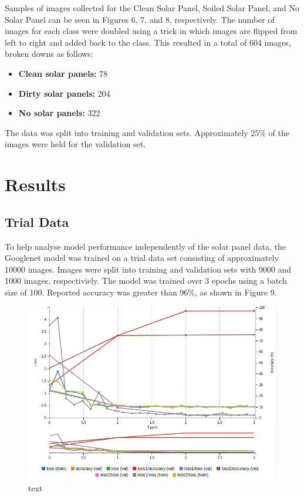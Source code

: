 \documentclass[10pt,journal,compsoc]{IEEEtran}
\begin{document}
		Samples of images collected for the Clean Solar Panel, Soiled Solar Panel, and No Solar Panel can be seen in Figures 6, 7, and 8, respectively. The number of images for each class were doubled using a trick in which images are flipped from left to right and added back to the class. This resulted in a total of 604 images, broken downs as follows:
		\begin{itemize}
			\item \textbf{Clean solar panels:} 78
			\item \textbf{Dirty solar panels:} 204
			\item \textbf{No solar panels:} 322
		\end{itemize}
		
		The data was split into training and validation sets. Approximately 25\% of the images were held for the validation set.
		
		\section{Results}
		\subsection{Trial Data}
		To help analyse model performance independently of the solar panel data, the Googlenet model was trained on a trial data set consisting of approximately 10000 images. Images were split into training and validation sets with 9000 and 1000 images, respectiviely. The model was trained over 3 epochs using a batch size of 100. Reported accuracy was greater than 96\%, as shown in Figure 9. 
		\begin{figure}[h]
			\centering
			\includegraphics[scale=0.3]{trial_data_model_train}
			\caption{text}
		\end{figure}
		
\end{document}
